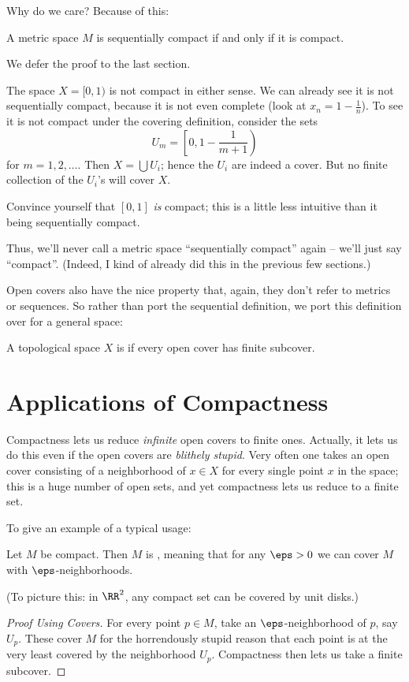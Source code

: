 Why do we care?
Because of this:
\begin{theorem}
	A metric space $M$ is sequentially compact if and only if it is compact.
	\label{thm:compactness_metric}
\end{theorem}
We defer the proof to the last section.
\begin{example}
	The space $X = [0,1)$ is not compact in either sense.
	We can already see it is not sequentially compact, because it is not even complete (look at $x_n = 1 - \frac 1n$).
	To see it is not compact under the covering definition, consider the sets
	\[ U_m = \left[0, 1 - \frac{1}{m+1} \right) \]
	for $m = 1, 2, \dots$. Then $X = \bigcup U_i$; hence the $U_i$ are indeed a cover.
	But no finite collection of the $U_i$'s will cover $X$.
\end{example}
\begin{ques}
	Convince yourself that $[0,1]$ \emph{is} compact;
	this is a little less intuitive than it being sequentially compact.
\end{ques}
\begin{abuse}
	Thus, we'll never call a metric space ``sequentially compact'' again -- we'll just say ``compact''.
	(Indeed, I kind of already did this in the previous few sections.)
\end{abuse}

Open covers also have the nice property that, again, they don't refer to metrics or sequences.
So rather than port the sequential definition, we port this definition over for a general space:
\begin{definition}
	A topological space $X$ is  if every open cover has finite subcover.
\end{definition}

\section{Applications of Compactness}
Compactness lets us reduce \emph{infinite} open covers to finite ones.
Actually, it lets us do this even if the open covers are \emph{blithely stupid}.
Very often one takes an open cover consisting of a neighborhood of $x \in X$
for every single point $x$ in the space; this is a huge number of open sets,
and yet compactness lets us reduce to a finite set.

To give an example of a typical usage:
\begin{proposition}
	Let $M$ be compact.
	Then $M$ is , meaning
	that for any $\eps > 0$ we can cover $M$ with $\eps$-neighborhoods.
\end{proposition}
(To picture this: in $\RR^2$, any compact set can be covered by unit disks.)
\begin{proof}[Proof Using Covers]
	For every point $p \in M$, take an $\eps$-neighborhood of $p$, say $U_p$.
	These cover $M$ for the horrendously stupid reason that each point is
	at the very least covered by the neighborhood $U_p$.
	Compactness then lets us take a finite subcover.
\end{proof}

